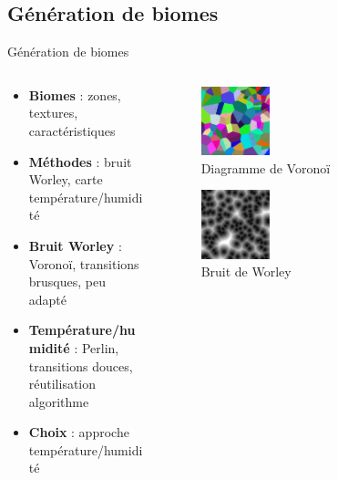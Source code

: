\documentclass[aspectratio=169]{beamer}
\begin{document}
\subsection{Génération de biomes}

\begin{frame}{Génération de biomes}
    \begin{columns}
        \centering
        \begin{column}{0.5\textwidth}
            \centering
            \begin{itemize}
                \item \textbf{Biomes} : zones, textures, caractéristiques
                \item \textbf{Méthodes} : bruit Worley, carte température/humidité
                \item \textbf{Bruit Worley} : Voronoï, transitions brusques, peu adapté
                \item \textbf{Température/humidité} : Perlin, transitions douces, réutilisation algorithme
                \item \textbf{Choix} : approche température/humidité
            \end{itemize}
        \end{column}
        \begin{column}{0.5\textwidth}
            \centering
            \begin{figure}
                \centering
                \captionsetup{format=sanslabel}
                \includegraphics[width=0.3\textwidth]{assets/voronoi.png}
                \caption{Diagramme de Voronoï}
            \end{figure}
            \begin{figure}
                \centering
                \captionsetup{format=sanslabel}
                \includegraphics[width=0.3\textwidth]{assets/Worley.jpg}
                \caption{Bruit de Worley}
            \end{figure}
        \end{column}
    \end{columns}
\end{frame}
\end{document}
